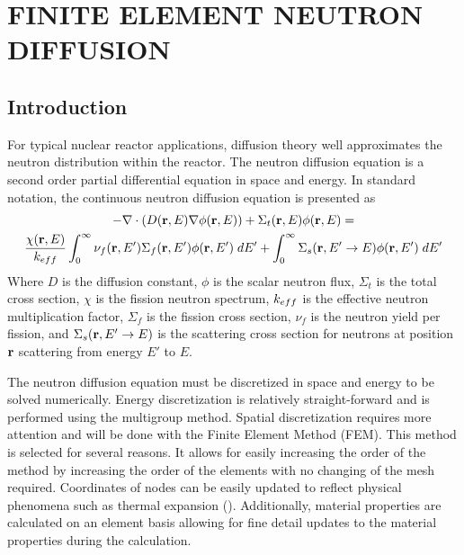 \chapter{FINITE ELEMENT NEUTRON DIFFUSION}
\label{ch:neutronDiffusion}

\section{Introduction}
  For typical nuclear reactor applications, diffusion theory well approximates 
  the neutron distribution within the reactor. The neutron diffusion equation is
  a second order partial differential equation in space and energy. In standard
  notation, the continuous neutron diffusion equation is presented as
  \begin{multline}\label{eq:continuous_diffusion}
    -\mathbf{\nabla} \cdot (D(\mathbf{r},E) \mathbf{\nabla} \phi(\mathbf{r},E)) + \Sigma_t(\mathbf{r},E) \phi(\mathbf{r},E) = \\
      \frac{\chi(\mathbf{r},E)}{k_{eff}} \int_0^{\infty} \nu_f(\mathbf{r},E') \Sigma_f(\mathbf{r},E') 
      \phi(\mathbf{r},E') \; dE' + \int_0^{\infty} \Sigma_s(\mathbf{r},E' \rightarrow E) 
      \phi(\mathbf{r},E') \; dE'
  \end{multline}
  Where $D$ is the diffusion constant, $\phi$ is the scalar neutron flux, 
  $\Sigma_t$ is the total cross section, $\chi$ is the fission neutron 
  spectrum, $k_{eff}$ is the effective neutron multiplication factor, $\Sigma_f$ 
  is the fission cross section, $\nu_f$ is the neutron yield per fission, and 
  $\Sigma_s(\mathbf{r},E' \rightarrow E)$ is the scattering cross section for neutrons 
  at position $\mathbf{r}$ scattering from energy $E'$ to $E$.
  
  The neutron diffusion equation must be discretized in space and 
  energy to be solved numerically. Energy discretization is relatively 
  straight-forward and is performed using the multigroup method. Spatial 
  discretization requires more attention and will be done with the Finite 
  Element Method (FEM). This method is selected for several reasons. It allows
  for easily increasing the order of the method by increasing the order of the 
  elements with no changing of the mesh required. Coordinates of nodes can be 
  easily updated to reflect physical phenomena such as thermal expansion 
  (). Additionally, material properties are 
  calculated on an element basis allowing for fine detail updates to the 
  material properties during the calculation.
  
